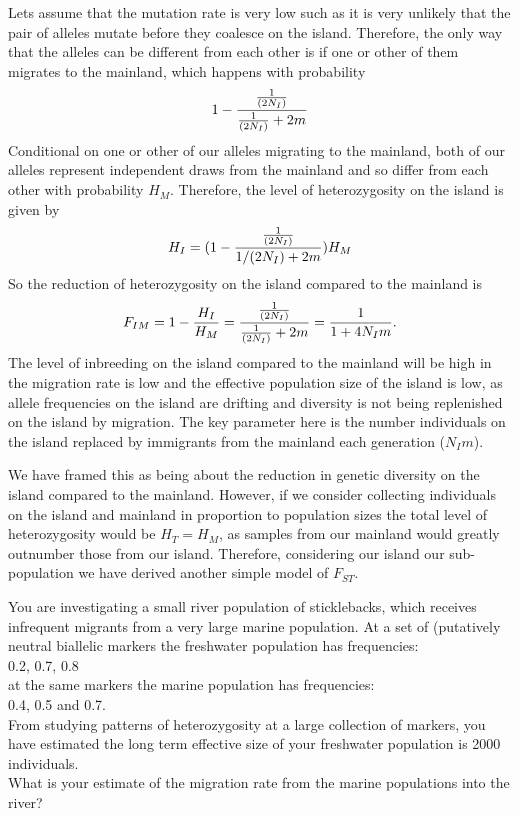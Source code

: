 Lets assume that the mutation rate is very low such as it is very
unlikely that the pair of alleles mutate before they coalesce on the
island. Therefore, the only way that the alleles can be different from
each other is if one or other of them migrates to the mainland, which
happens with probability  
\begin{equation}
  1 - \frac{\nicefrac{1}{(2N_I)}}{\nicefrac{1}{(2N_I)} + 2m}
\end{equation}
Conditional on one or other of our alleles migrating to the mainland,
both of our alleles represent independent draws from the mainland and
so differ from each other with probability $H_M$. Therefore, the level of
heterozygosity on the island is given by
\begin{equation}
  H_I = (1 - \frac{\nicefrac{1}{(2N_I)}}{1/(2N_I) + 2m})H_M
\end{equation}
So the reduction of heterozygosity on the island compared to the
mainland is
\begin{equation}
  F_{IM} = 1- \frac{H_I}{H_M} = \frac{\nicefrac{ 1}{(2N_I)}}{\nicefrac{1}{(2N_I)} + 2m} = \frac{ 1 }{1 + 4N_Im}.
\end{equation}
The level of inbreeding on the island compared to the mainland will
be high in the migration rate is low and the effective population size
of the island is low, as allele frequencies on the island are drifting
and diversity is not being replenished on the island by migration. The
key parameter here is the number individuals on the island replaced by
immigrants from the mainland each generation ($N_I m$).

We have framed this as being about the reduction in genetic diversity on the
island compared to the mainland. However, if we consider collecting 
individuals on the island and mainland in proportion to population
sizes the total level of heterozygosity would be $H_T=H_M$, as samples
from our mainland would greatly outnumber those from our
island. Therefore, considering our island our sub-population we have
derived another simple model of $F_{ST}$.

\begin{question}
You are investigating a small river population of sticklebacks, which receives infrequent migrants from a very large marine population. At a set of (putatively neutral biallelic markers the freshwater population has frequencies:\\
0.2, 0.7, 0.8\\
at the same markers the marine population has frequencies:\\
0.4, 0.5 and 0.7.\\
 From studying patterns of heterozygosity at a large collection of markers, you have estimated the long term effective size of your freshwater population is 2000 individuals.\\
What is your estimate of the migration rate from the marine
populations into the river?
\end{question}

